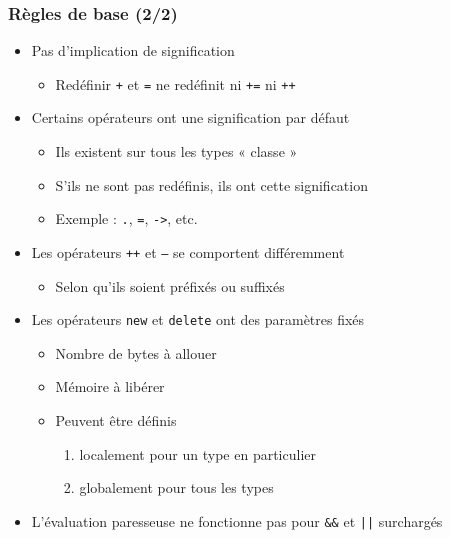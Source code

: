 \begin{frame}
\frametitle{Règles de base (2/2)}
\begin{itemize}[<+->]
\item Pas d'implication de signification
	\begin{itemize}
	\item Redéfinir \texttt{+} et \texttt{=} ne redéfinit ni \texttt{+=} ni \texttt{++}
	\end{itemize}
\item Certains opérateurs ont une signification par défaut
	\begin{itemize}
	\item Ils existent sur tous les types « classe »
	\item S'ils ne sont pas redéfinis, ils ont cette signification
	\item Exemple : \texttt{.}, \texttt{=}, \texttt{->}, etc.
	\end{itemize}
\item Les opérateurs \texttt{++} et \texttt{--} se comportent différemment
	\begin{itemize}
	\item Selon qu'ils soient préfixés ou suffixés
	\end{itemize}
\item Les opérateurs \lstinline|new| et \lstinline|delete| ont des paramètres fixés
	\begin{itemize}
	\item Nombre de bytes à allouer
	\item Mémoire à libérer
	\item Peuvent être définis
		\begin{enumerate}
		\item localement pour un type en particulier
		\item globalement pour tous les types
		\end{enumerate}
	\end{itemize}
\item L'évaluation paresseuse ne fonctionne pas pour \texttt{\&\&} et \texttt{||} surchargés
\end{itemize}
\end{frame}

